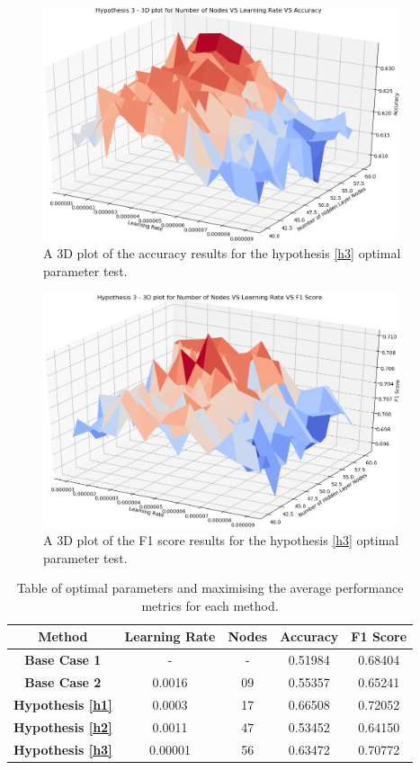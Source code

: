 \documentclass{UoYCSproject}
\begin{document}
\begin{figure}[h]
\includegraphics[width=10.5cm]{h3_accuracy.png}
\centering
\caption{A 3D plot of the accuracy results for the hypothesis \ref{h3} optimal parameter test.} 
\label{fig:h3_plot_accuracy}
\end{figure}

\begin{figure}[h]
\includegraphics[width=10.5cm]{h3_f1.png}
\centering
\caption{A 3D plot of the F1 score results for the hypothesis \ref{h3} optimal parameter test.} 
\label{fig:h3_plot_f1}
\end{figure}

\begin{table}[h]
    \centering
    \begin{tabular}{|c|c|c|c|c|} \hline
        \textbf{Method} & \textbf{Learning Rate} & \textbf{Nodes} & \textbf{Accuracy} & \textbf{F1 Score} \\ \hline
        \textbf{Base Case 1} & - & - & 0.51984 & 0.68404 \\
        \textbf{Base Case 2} & 0.0016 & 09 & 0.55357 & 0.65241 \\
        \textbf{Hypothesis \ref{h1}} & 0.0003 & 17 & 0.66508 & 0.72052 \\
        \textbf{Hypothesis \ref{h2}} & 0.0011 & 47 & 0.53452 & 0.64150 \\
        \textbf{Hypothesis \ref{h3}} & 0.00001 & 56 & 0.63472 & 0.70772  \\
        \hline
    \end{tabular}
    \caption{Table of optimal parameters and maximising the average performance metrics for each method.}
    \label{tab:test_results}
\end{table}
\end{document}

